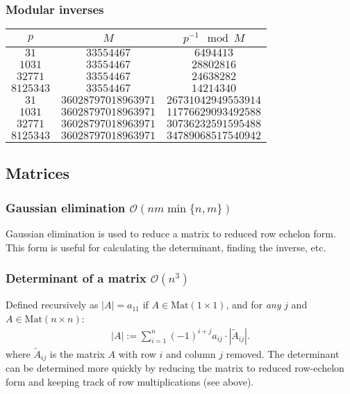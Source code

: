 \subsubsection{Modular inverses}
\begin{table}[H]
    \centering
    \begin{tabular}{|c|c|c|}
        \hline
        $p$ & $M$ & $p^{-1} \mod M$ \\
        \hline
        $31$ & $33554467$ & $6494413$ \\
        $1031$ & $33554467$ & $28802816$ \\
        $32771$ & $33554467$ & $24638282$ \\
        $8125343$ & $33554467$ & $14214340$ \\
        $31$ & $36028797018963971$ & $26731042949553914$ \\
        $1031$ & $36028797018963971$ & $11776629093492588$ \\
        $32771$ & $36028797018963971$ & $30736232591595488$ \\
        $8125343$ & $36028797018963971$ & $34789068517540942$ \\
        \hline
    \end{tabular}
    \label{tab:modinv}
\end{table}



\subsection{Matrices}

\subsubsection{Gaussian elimination $\mathcal O(nm\min\{n,m\})$}
Gaussian elimination is used to reduce a matrix to reduced row echelon form. This form is useful for calculating the determinant, finding the inverse, etc.

\subsubsection{Determinant of a matrix $\mathcal{O}(n^3)$}
Defined recursively as $|A| = a_{11}$ if $A \in \text{Mat}(1 \times 1)$, and
for \textit{any} $j$ and $A \in \text{Mat}(n \times n)$:
\begin{align*}
    |A| := \sum_{i=1}^n (-1)^{i+j} a_{ij} \cdot |\tilde A_{ij}|.
\end{align*}
where $\tilde A_{ij}$ is the matrix $A$ with row $i$ and column $j$ removed. The determinant can be determined more quickly by reducing the matrix to reduced row-echelon form and keeping track of row multiplications (see above).

